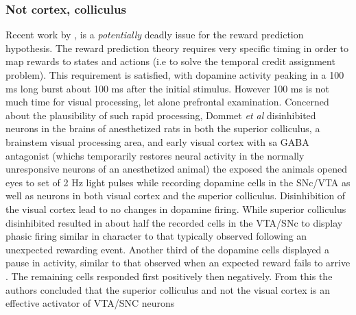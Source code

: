 \documentclass[doc,12pt]{apa}        %
\begin{document}
\subsubsection{Not cortex, colliculus}
\label{sub:not_cor_colliculus}
Recent work by , is a \emph{potentially} deadly issue for the reward prediction hypothesis.  The reward prediction theory requires very specific timing in order to map rewards to states and actions (i.e to solve the temporal credit assignment problem).  This requirement is satisfied, with dopamine activity peaking in a 100 ms long burst about 100 ms after the initial stimulus.  However 100 ms is not much time for visual processing, let alone prefrontal examination.  Concerned about the plausibility of such rapid processing, Dommet \emph{et al} disinhibited neurons in the brains of anesthetized rats in both the superior colliculus, a brainstem visual processing area, and early visual cortex with sa GABA antagonist (whichs temporarily restores neural activity in the normally unresponsive neurons of an anesthetized animal) the exposed the animals opened eyes to set of 2 Hz light pulses while recording dopamine cells in the SNc/VTA as well as neurons in both visual cortex and the superior colliculus.  Disinhibition of the visual cortex lead to no changes in dopamine firing.  While superior colliculus disinhibited resulted in about half the recorded cells in the VTA/SNc to display phasic firing similar in character to that typically observed following an unexpected rewarding event.  Another third of the dopamine cells displayed a pause in activity, similar to that observed when an expected reward fails to arrive \cite{Mirenowicz:1994p7185}.  The remaining cells responded first positively then negatively.  From this the authors concluded that the superior colliculus and not the visual cortex is an effective activator of VTA/SNC neurons
\end{document}
